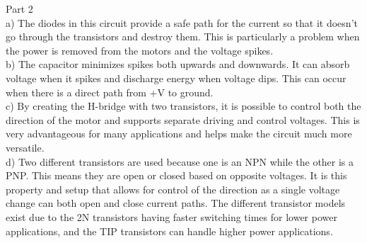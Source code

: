\documentclass[CMPE]{KGCOEReport}
\begin{document}
Part 2 \\
a) The diodes in this circuit provide a safe path for the current so that it 
doesn't go through the transistors and destroy them. 
This is particularly a problem when the power is removed from the motors and 
the voltage spikes. \\
b) The capacitor minimizes spikes both upwards and downwards. It can absorb 
voltage when it spikes and discharge 
energy when voltage dips. This can occur when there is a direct path from +V 
to ground. \\
c) By creating the H-bridge with two transistors, it is possible to control 
both the direction of the motor and supports separate 
driving and control voltages. This is very advantageous for many applications 
and helps make the circuit much more versatile. \\
d) Two different transistors are used because one is an NPN while the other is
a PNP. This means they are open or closed based 
on opposite voltages. It is this property and setup that allows for control of
the direction as a single voltage change can both 
open and close current paths. The different transistor models exist due to the
2N transistors having faster switching times
for lower power applications, and the TIP transistors can handle higher power 
applications. \\ \newpage
\end{document}
